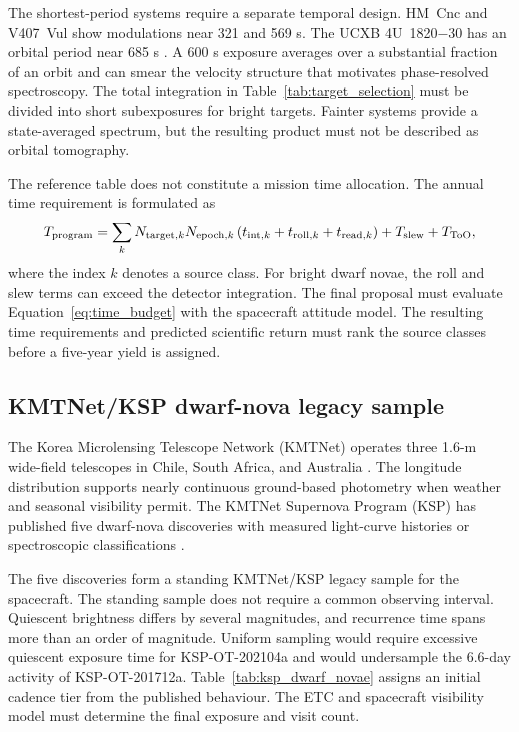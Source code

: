 \documentclass[10pt,onecolumn]{article}
\begin{document}
The shortest-period systems require a separate temporal design. HM~Cnc and
V407~Vul show modulations near 321 and 569 s. The UCXB 4U~1820$-$30 has an
orbital period near 685 s \cite{barros2007,stella1987}. A 600 s exposure
averages over a substantial fraction of an orbit and can smear the velocity
structure that motivates phase-resolved spectroscopy. The total
integration in Table~\ref{tab:target_selection} must be divided into short
subexposures for bright targets. Fainter systems provide a state-averaged
spectrum, but the resulting product must not be described as orbital
tomography.

The reference table does not constitute a mission time allocation. The annual
time requirement is formulated as
\begin{equation}
 T_{\rm program} =
 \sum_k N_{{\rm target},k}N_{{\rm epoch},k}
 \left(t_{{\rm int},k}+t_{{\rm roll},k}+t_{{\rm read},k}\right)
 + T_{\rm slew}+T_{\rm ToO},
 \label{eq:time_budget}
\end{equation}
where the index $k$ denotes a source class. For bright dwarf novae, the roll
and slew terms can exceed the detector integration. The final proposal must
evaluate Equation~\ref{eq:time_budget} with the spacecraft attitude model. The
resulting time requirements and predicted scientific return must rank the
source classes before a five-year yield is assigned.

\subsection{KMTNet/KSP dwarf-nova legacy sample}

The Korea Microlensing Telescope Network (KMTNet) operates three 1.6-m
wide-field telescopes in Chile, South Africa, and Australia
\cite{kim2016kmtnet}. The longitude distribution supports nearly continuous
ground-based photometry when weather and seasonal visibility permit. The
KMTNet Supernova Program (KSP) has published five dwarf-nova discoveries with
measured light-curve histories or spectroscopic classifications
\cite{brown2018ksp,lee2019ksp,lee2022ksp,lee2024ksp,kim2026ksp}.

The five discoveries form a standing KMTNet/KSP legacy sample for the
spacecraft. The standing sample does not require a common observing interval.
Quiescent brightness differs by several magnitudes, and recurrence time spans
more than an order of magnitude. Uniform sampling would require excessive
quiescent exposure time for KSP-OT-202104a and would undersample the 6.6-day
activity of KSP-OT-201712a. Table~\ref{tab:ksp_dwarf_novae} assigns an initial
cadence tier from the published behaviour. The ETC and spacecraft visibility
model must determine the final exposure and visit count.
\end{document}
